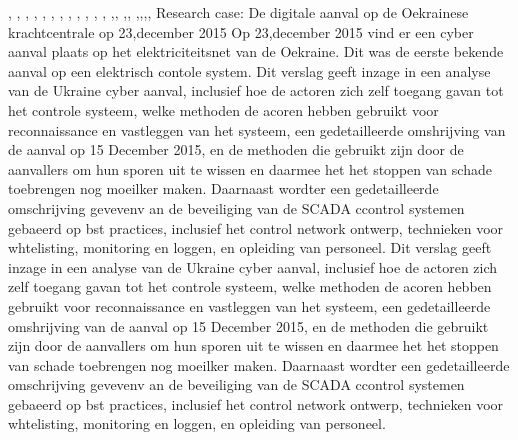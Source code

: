 \cite{kingskey19042022tjernobyl},
\cite{erikbork26042023reactor4},
\cite{nosTjernobyl30jaarlater},
\cite{knmi04052021tjernobylbosbrand},
\cite{dodonovaKVIRisicoTjernobyl},
\cite{dumarey04062020verhaalTjernobylWaarheid},
\cite{sparkesNewScientistTjernoby},
\cite{kernenergiened26041986chronologiemaatregelen},
\cite{mapszoneReactor},
\cite{kernhistoriek15062021tjernobyl},
\cite{nucleairforumFeitenTjernobyl},
\cite{kernongevalTjernobylFancGov},
\cite{arendswolters062019lessenTjernobyl},\cite{damveld08052020tjernobyl},
\cite{deVriestjernobylHolland},\cite{ing3enieur29042015antistralingskoepel},
\cite{verschuur14012013tjernobylreports},\cite{paperlessarchivesTjernobyl},\cite{vargos082000tjernobylconcerns},\cite{mauroNuclearRiskSociety},\cite{vienna06092005LookingBack}
\newline \indent  Research case: De digitale aanval op de Oekrainese krachtcentrale op 23,december 2015
Op 23,december 2015  vind er een cyber aanval plaats op het elektriciteitsnet van de Oekraine. Dit was de eerste bekende aanval op een elektrisch contole  system.  Dit verslag geeft inzage in een analyse van de Ukraine cyber aanval,
inclusief hoe de actoren zich zelf toegang gavan tot het controle systeem, welke methoden de acoren hebben gebruikt voor reconnaissance en vastleggen van het systeem, een gedetailleerde omshrijving van de aanval op 15 December 2015, en de methoden die gebruikt zijn door de aanvallers om hun sporen uit te wissen en daarmee het het stoppen van schade toebrengen  nog moeilker maken. Daarnaast wordter  een gedetailleerde omschrijving gevevenv an de beveiliging van de SCADA ccontrol systemen gebaeerd op bst practices, inclusief het control network ontwerp, technieken voor whtelisting, monitoring en loggen, en  opleiding van personeel.
\cite{Whitehead2017ukrainepoweroutage}
\cite{noauthor_2022-nm}
\cite{zetter2016GridHack}
\cite{owens21032017ukrainemitigationstrategies}
\cite{cerulus2019FrontlineRussiaAttack}
\cite{grammatikis2019AttackIEC6087505104}
\cite{hidajat2016ScadaSimulator}
\cite{uscert20072021crashmalware}
\cite{zetter12062017malwareanalysis}
\cite{icsRussianHackingCyberWeapon}
\cite{usgovC2M2}
Dit verslag geeft inzage in een analyse van de Ukraine cyber aanval,
inclusief hoe de actoren zich zelf toegang gavan tot het controle systeem, welke methoden de acoren hebben gebruikt voor reconnaissance en vastleggen van het systeem, een gedetailleerde omshrijving van de aanval op 15 December 2015, en de methoden die gebruikt zijn door de aanvallers om hun sporen uit te wissen en daarmee het het stoppen van schade toebrengen  nog moeilker maken. Daarnaast wordter  een gedetailleerde omschrijving gevevenv an de beveiliging van de SCADA ccontrol systemen gebaeerd op bst practices, inclusief het control network ontwerp, technieken voor whtelisting, monitoring en loggen, en  opleiding van personeel.
